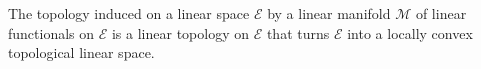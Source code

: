 The topology induced on a linear space $\mathcal{E}$ by a linear manifold $\mathcal{M}$ of linear functionals on $\mathcal{E}$ is a linear topology on $\mathcal{E}$ that turns $\mathcal{E}$ into a locally convex topological linear space.
